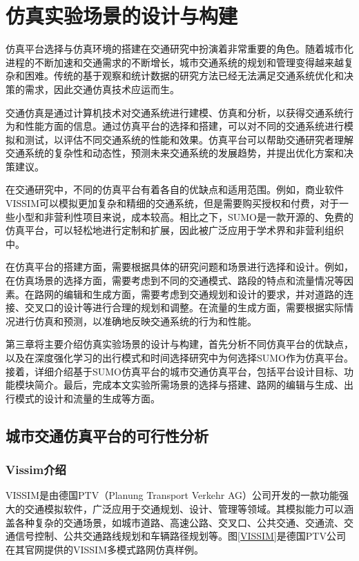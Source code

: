 \chapter{仿真实验场景的设计与构建}

仿真平台选择与仿真环境的搭建在交通研究中扮演着非常重要的角色。随着城市化进程的不断加速和交通需求的不断增长，城市交通系统的规划和管理变得越来越复杂和困难。传统的基于观察和统计数据的研究方法已经无法满足交通系统优化和决策的需求，因此交通仿真技术应运而生。

交通仿真是通过计算机技术对交通系统进行建模、仿真和分析，以获得交通系统行为和性能方面的信息。通过仿真平台的选择和搭建，可以对不同的交通系统进行模拟和测试，以评估不同交通系统的性能和效果。仿真平台可以帮助交通研究者理解交通系统的复杂性和动态性，预测未来交通系统的发展趋势，并提出优化方案和决策建议。

在交通研究中，不同的仿真平台有着各自的优缺点和适用范围。例如，商业软件VISSIM可以模拟更加复杂和精细的交通系统，但是需要购买授权和付费，对于一些小型和非营利性项目来说，成本较高。相比之下，SUMO是一款开源的、免费的仿真平台，可以轻松地进行定制和扩展，因此被广泛应用于学术界和非营利组织中。

在仿真平台的搭建方面，需要根据具体的研究问题和场景进行选择和设计。例如，在仿真场景的选择方面，需要考虑到不同的交通模式、路段的特点和流量情况等因素。在路网的编辑和生成方面，需要考虑到交通规划和设计的要求，并对道路的连接、交叉口的设计等进行合理的规划和调整。在流量的生成方面，需要根据实际情况进行仿真和预测，以准确地反映交通系统的行为和性能。

第三章将主要介绍仿真实验场景的设计与构建，首先分析不同仿真平台的优缺点，以及在深度强化学习的出行模式和时间选择研究中为何选择SUMO作为仿真平台。接着，详细介绍基于SUMO仿真平台的城市交通仿真平台，包括平台设计目标、功能模块简介。最后，完成本文实验所需场景的选择与搭建、路网的编辑与生成、出行模式的设计和流量的生成等方面。

\section{城市交通仿真平台的可行性分析}
\label{section:3.1}

\subsection{Vissim介绍}

VISSIM是由德国PTV（Planung Transport Verkehr AG）公司开发的一款功能强大的交通模拟软件，广泛应用于交通规划、设计、管理等领域。其模拟能力可以涵盖各种复杂的交通场景，如城市道路、高速公路、交叉口、公共交通、交通流、交通信号控制、公共交通路线规划和车辆路径规划等。图\ref{VISSIM}是德国PTV公司在其官网提供的VISSIM多模式路网仿真样例。

